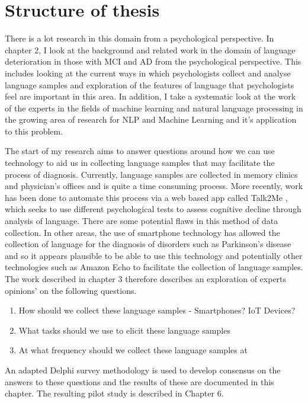 \documentclass[10pt, letterpaper, twoside, openany]{thesis}
\begin{document}
\section{Structure of thesis}
There is a lot research in this domain from a psychological perspective. In chapter 2, I look at the background and related work in the domain of language deterioration in those with MCI and AD from the psychological perspective. This includes looking at the current ways in which psychologists collect and analyse language samples and exploration of the features of language that psychologists feel are important in this area. In addition, I take a systematic look at the work of the experts in the fields of machine learning and natural language processing in the growing area of research for NLP and Machine Learning and it's application to this problem. 
\par 
The start of my research aims to answer questions around how we can use technology to aid us in collecting language samples that may facilitate the process of diagnosis. Currently, language samples are collected in memory clinics and physician's offices and is quite a time consuming process. More recently, work has been done to automate this process via a web based app called Talk2Me \cite{Komeili2019}, which seeks to use different psychological tests to assess cognitive decline through analysis of language. There are some potential flaws in this method of data collection.  In other areas, the use of smartphone technology has allowed the collection of language for the diagnosis of disorders such as Parkinson's disease and so it appears plausible to be able to use this technology and potentially other technologies such as Amazon Echo to facilitate the collection of language samples. The work described in chapter 3 therefore describes an exploration of experts opinions' on the following questions.
\begin{enumerate}
	\item How should we collect these language samples - Smartphones? IoT Devices?
	\item What tasks should we use to elicit these language samples
	\item At what frequency should we collect these language samples at
\end{enumerate}
\par 
An adapted Delphi survey methodology is used to develop consensus on the answers to these questions and the results of these are documented in this chapter. The resulting pilot study is described in Chapter 6.
\end{document}
